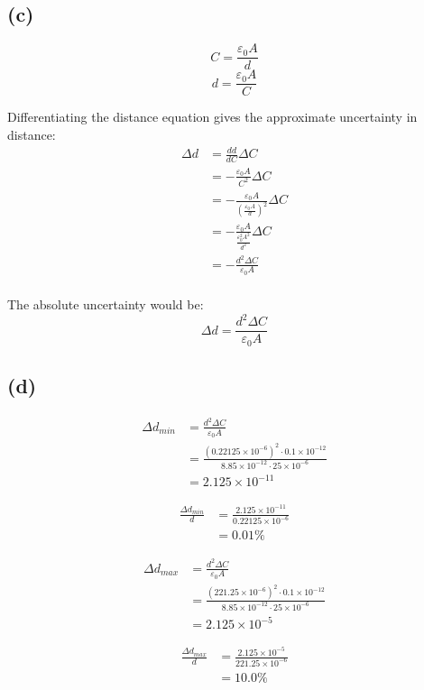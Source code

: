 \documentclass[11pt]{article}
\begin{document}
\subsection{(c)}
\label{sec:orgfe0698f}
\[C = \frac{\varepsilon_0 A}{d}\]
\[d = \frac{\varepsilon_0 A}{C}\]

Differentiating the distance equation gives the approximate uncertainty in distance:
\begin{align*}
\Delta d &= \frac{dd}{dC} \Delta C \\
&= -\frac{\varepsilon_0 A}{C^2} \Delta C \\
&= -\frac{\varepsilon_0 A}{\left(\frac{\varepsilon_0 A}{d} \right)^2} \Delta C \\
&= -\frac{\varepsilon_0 A}{\frac{\varepsilon_0^2 A^2}{d^2}} \Delta C \\
&= -\frac{d^2 \Delta C}{\varepsilon_0 A} \\
\end{align*}

The absolute uncertainty would be:
\[\Delta d = \frac{d^2 \Delta C}{\varepsilon_0 A}\]

\subsection{(d)}
\label{sec:org812aa1c}
\begin{align*}
\Delta d_{min} &= \frac{d^2 \Delta C}{\varepsilon_0 A} \\
&= \frac{(0.22125 \times 10^{-6})^2 \cdot 0.1 \times 10^{-12}}{8.85 \times 10^{-12} \cdot 25 \times 10^{-6}} \\
&= 2.125 \times 10^{-11}
\end{align*}

\begin{align*}
\frac{\Delta d_{min}}{d} &= \frac{2.125 \times 10^{-11}}{0.22125 \times 10^{-6}} \\
&= 0.01\%
\end{align*}

\begin{align*}
\Delta d_{max} &= \frac{d^2 \Delta C}{\varepsilon_0 A} \\
&= \frac{(221.25 \times 10^{-6})^2 \cdot 0.1 \times 10^{-12}}{8.85 \times 10^{-12} \cdot 25 \times 10^{-6}} \\
&= 2.125 \times 10^{-5}
\end{align*}

\begin{align*}
\frac{\Delta d_{max}}{d} &= \frac{2.125 \times 10^{-5}}{221.25 \times 10^{-6}} \\
&= 10.0\%
\end{align*}
\end{document}

